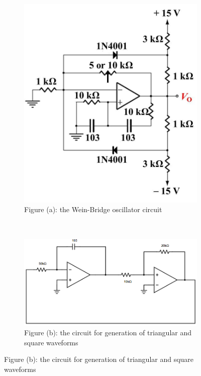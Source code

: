 \documentclass{article}
\begin{document}
\begin{CJK*}{UTF8}{bkai}
\begin{figure}[h]
    \begin{center}
        \begin{subfigure}[b]{0.38\textwidth}
            \includegraphics[width=\textwidth]{wein-bridge.png}
            \caption*{Figure (a): the Wein-Bridge oscillator circuit}
        \end{subfigure}
        ~
        \begin{subfigure}[b]{0.55\textwidth}
            \includegraphics[width=\textwidth]{gen_tri_and_squ.png}
            \caption*{Figure (b): the circuit for generation of triangular and
square waveforms}
        \end{subfigure}
    \end{center}
\end{figure}
    
\end{CJK*}
\end{document}
